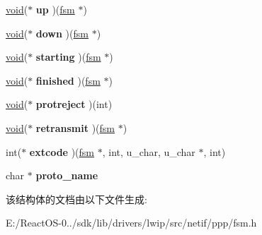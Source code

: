 \begin{DoxyCompactItemize}
\hyperlink{interfacevoid}{void}($\ast$ {\bfseries up} )(\hyperlink{structfsm}{fsm} $\ast$)
\item 
\mbox{\label{structfsm__callbacks_a5c36248f15803b703bf4b00d7fd27295}} 
\hyperlink{interfacevoid}{void}($\ast$ {\bfseries down} )(\hyperlink{structfsm}{fsm} $\ast$)
\item 
\mbox{\label{structfsm__callbacks_ad2dcf4b841d43d395dbfa0d4eee282c6}} 
\hyperlink{interfacevoid}{void}($\ast$ {\bfseries starting} )(\hyperlink{structfsm}{fsm} $\ast$)
\item 
\mbox{\label{structfsm__callbacks_abc3df82bc04b89f2666cf210a1eb2c33}} 
\hyperlink{interfacevoid}{void}($\ast$ {\bfseries finished} )(\hyperlink{structfsm}{fsm} $\ast$)
\item 
\mbox{\label{structfsm__callbacks_a94a1c41e71a725645953d1cd003fe7a5}} 
\hyperlink{interfacevoid}{void}($\ast$ {\bfseries protreject} )(int)
\item 
\mbox{\label{structfsm__callbacks_a6b392ace3620de7c5f49293111eb164b}} 
\hyperlink{interfacevoid}{void}($\ast$ {\bfseries retransmit} )(\hyperlink{structfsm}{fsm} $\ast$)
\item 
\mbox{\label{structfsm__callbacks_a7e4fbf306869a32afa5e9753f6014d10}} 
int($\ast$ {\bfseries extcode} )(\hyperlink{structfsm}{fsm} $\ast$, int, u\+\_\+char, u\+\_\+char $\ast$, int)
\item 
\mbox{\label{structfsm__callbacks_aa35debcd7d6589ed37fef4057ac6bac3}} 
char $\ast$ {\bfseries proto\+\_\+name}
\end{DoxyCompactItemize}


该结构体的文档由以下文件生成\+:\begin{DoxyCompactItemize}
\item 
E\+:/\+React\+O\+S-\/0../sdk/lib/drivers/lwip/src/netif/ppp/fsm.\+h\end{DoxyCompactItemize}
